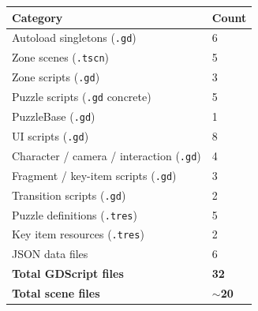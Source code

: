 \documentclass[12pt, a4paper]{article}
\begin{document}
\begin{center}
\begin{tabular}{ll}
\toprule
\textbf{Category} & \textbf{Count} \\
\midrule
Autoload singletons (\texttt{.gd})        & 6  \\
Zone scenes (\texttt{.tscn})              & 5  \\
Zone scripts (\texttt{.gd})               & 3  \\
Puzzle scripts (\texttt{.gd} concrete)    & 5  \\
PuzzleBase (\texttt{.gd})                 & 1  \\
UI scripts (\texttt{.gd})                 & 8  \\
Character / camera / interaction (\texttt{.gd}) & 4 \\
Fragment / key-item scripts (\texttt{.gd}) & 3 \\
Transition scripts (\texttt{.gd})         & 2  \\
Puzzle definitions (\texttt{.tres})       & 5  \\
Key item resources (\texttt{.tres})       & 2  \\
JSON data files                           & 6  \\
\midrule
\textbf{Total GDScript files}             & \textbf{32} \\
\textbf{Total scene files}               & \textbf{$\sim$20} \\
\bottomrule
\end{tabular}
\end{center}
\end{document}
